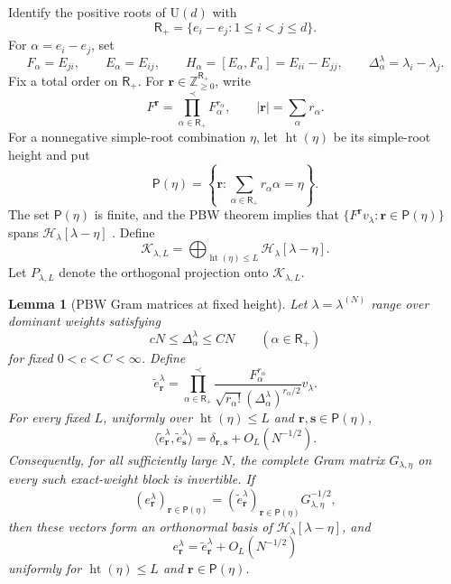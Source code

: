 \documentclass[11pt]{article}
\newtheorem{lemma}[lemma]{Lemma}
\theoremstyle{remark}
\theoremstyle{plain}
\newcommand{\cH}{\mathcal H}
\newcommand{\U}{\mathrm U}
\begin{document}
Identify the positive roots of \(\U(d)\) with
\[
  \mathsf R_+=\{e_i-e_j:1\le i<j\le d\}.
\]
For \(\alpha=e_i-e_j\), set
\[
  F_\alpha=E_{ji},
  \qquad E_\alpha=E_{ij},
  \qquad H_\alpha=[E_\alpha,F_\alpha]=E_{ii}-E_{jj},
  \qquad \Delta_\alpha^\lambda=\lambda_i-\lambda_j.
\]
Fix a total order on \(\mathsf R_+\).  For
\(\mathbf r\in\mathbb Z_{\ge0}^{\mathsf R_+}\), write
\[
  F^{\mathbf r}=\prod_{\alpha\in\mathsf R_+}^{\prec}F_\alpha^{r_\alpha},
  \qquad |\mathbf r|=\sum_\alpha r_\alpha.
\]
For a nonnegative simple-root combination \(\eta\), let
\(\operatorname{ht}(\eta)\) be its simple-root height and put
\[
  \mathsf P(\eta)
  =\left\{\mathbf r:\sum_{\alpha\in\mathsf R_+}r_\alpha\alpha=\eta\right\}.
\]
The set \(\mathsf P(\eta)\) is finite, and the PBW theorem implies that
\(\{F^{\mathbf r}v_\lambda:\mathbf r\in\mathsf P(\eta)\}\) spans
\(\cH_\lambda[\lambda-\eta]\) \cite{FultonHarris1991}.  Define
\begin{equation}\label{eq:PBW-height-subspace}
  \mathcal K_{\lambda,L}
  =\bigoplus_{\operatorname{ht}(\eta)\le L}
    \cH_\lambda[\lambda-\eta].
\end{equation}
Let \(P_{\lambda,L}\) denote the orthogonal projection onto
\(\mathcal K_{\lambda,L}\).

\begin{lemma}[PBW Gram matrices at fixed height]
\label{lem:PBW-fixed-height}
Let \(\lambda=\lambda^{(N)}\) range over dominant weights satisfying
\[
  cN\le\Delta_\alpha^\lambda\le CN
  \qquad(\alpha\in\mathsf R_+)
\]
for fixed \(0<c<C<\infty\).  Define
\begin{equation}\label{eq:normalized-PBW-vectors}
  \widetilde e_{\mathbf r}^\lambda
  =\prod_{\alpha\in\mathsf R_+}^{\prec}
   \frac{F_\alpha^{r_\alpha}}
        {\sqrt{r_\alpha!}(\Delta_\alpha^\lambda)^{r_\alpha/2}}
   v_\lambda.
\end{equation}
For every fixed \(L\), uniformly over
\(\operatorname{ht}(\eta)\le L\) and
\(\mathbf r,\mathbf s\in\mathsf P(\eta)\),
\begin{equation}\label{eq:PBW-Gram-fixed-height}
  \langle\widetilde e_{\mathbf r}^\lambda,
         \widetilde e_{\mathbf s}^\lambda\rangle
  =\delta_{\mathbf r,\mathbf s}+O_L(N^{-1/2}).
\end{equation}
Consequently, for all sufficiently large \(N\), the complete Gram matrix
\(G_{\lambda,\eta}\) on every such exact-weight block is invertible.  If
\begin{equation}\label{eq:exact-block-orthonormalization}
  (e_{\mathbf r}^\lambda)_{\mathbf r\in\mathsf P(\eta)}
  =
  (\widetilde e_{\mathbf r}^\lambda)_{\mathbf r\in\mathsf P(\eta)}
  G_{\lambda,\eta}^{-1/2},
\end{equation}
then these vectors form an orthonormal basis of
\(\cH_\lambda[\lambda-\eta]\), and
\begin{equation}\label{eq:PBW-orthonormal-close}
  e_{\mathbf r}^\lambda
  =\widetilde e_{\mathbf r}^\lambda+O_L(N^{-1/2})
\end{equation}
uniformly for \(\operatorname{ht}(\eta)\le L\) and
\(\mathbf r\in\mathsf P(\eta)\).
\end{lemma}
\end{document}
